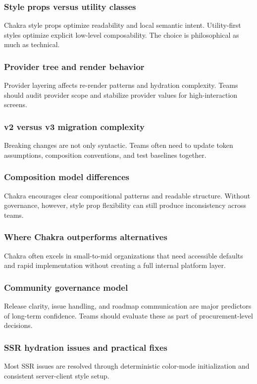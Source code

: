 \documentclass[11pt,twoside,a4paper]{article}
\begin{document}
\subsubsection{Style props versus utility classes}
Chakra style props optimize readability and local semantic intent. Utility-first styles optimize explicit low-level composability. The choice is philosophical as much as technical.

\subsubsection{Provider tree and render behavior}
Provider layering affects re-render patterns and hydration complexity. Teams should audit provider scope and stabilize provider values for high-interaction screens.

\subsubsection{v2 versus v3 migration complexity}
Breaking changes are not only syntactic. Teams often need to update token assumptions, composition conventions, and test baselines together.

\subsubsection{Composition model differences}
Chakra encourages clear compositional patterns and readable structure. Without governance, however, style prop flexibility can still produce inconsistency across teams.

\subsubsection{Where Chakra outperforms alternatives}
Chakra often excels in small-to-mid organizations that need accessible defaults and rapid implementation without creating a full internal platform layer.

\subsubsection{Community governance model}
Release clarity, issue handling, and roadmap communication are major predictors of long-term confidence. Teams should evaluate these as part of procurement-level decisions.

\subsubsection{SSR hydration issues and practical fixes}
Most SSR issues are resolved through deterministic color-mode initialization and consistent server-client style setup.
\end{document}
